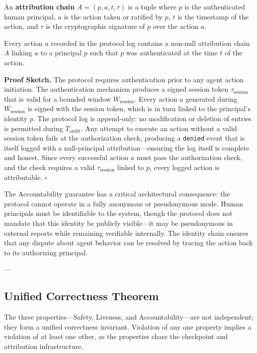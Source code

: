 \begin{definition}
An \textbf{attribution chain} $A = (p, a, t, \tau)$ is a tuple where $p$ is the authenticated human principal, $a$ is the action taken or ratified by $p$, $t$ is the timestamp of the action, and $\tau$ is the cryptographic signature of $p$ over the action $a$.
\end{definition}

\begin{invariant}
Every action $a$ recorded in the protocol log contains a non-null attribution chain $A$ linking $a$ to a principal $p$ such that $p$ was authenticated at the time $t$ of the action.
\end{invariant}

\textbf{Proof Sketch.} The protocol requires authentication prior to any agent action initiation. The authentication mechanism produces a signed session token $\tau_{\text{session}}$ that is valid for a bounded window $W_{\text{session}}$. Every action $a$ generated during $W_{\text{session}}$ is signed with the session token, which is in turn linked to the principal's identity $p$. The protocol log is append-only: no modification or deletion of entries is permitted during $T_{\text{audit}}$. Any attempt to execute an action without a valid session token fails at the authorization check, producing a \texttt{denied} event that is itself logged with a null-principal attribution—ensuring the log itself is complete and honest. Since every successful action $a$ must pass the authorization check, and the check requires a valid $\tau_{\text{session}}$ linked to $p$, every logged action is attributable. $\square$

The Accountability guarantee has a critical architectural consequence: the protocol cannot operate in a fully anonymous or pseudonymous mode. Human principals must be identifiable to the system, though the protocol does not mandate that this identity be publicly visible—it may be pseudonymous in external reports while remaining verifiable internally. The identity chain ensures that any dispute about agent behavior can be resolved by tracing the action back to its authorizing principal.

---

\subsection{Unified Correctness Theorem}

The three properties—Safety, Liveness, and Accountability—are not independent; they form a unified correctness invariant. Violation of any one property implies a violation of at least one other, as the properties share the checkpoint and attribution infrastructure.

